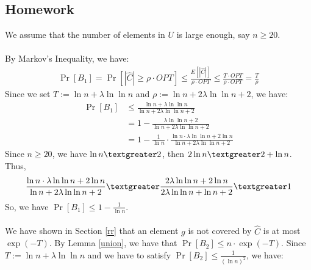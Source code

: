 \subsection{Homework}
We assume that the number of elements in $U$ is large enough, say $n \ge 20$.\\
\\
By Markov's Inequality, we have:
\begin{align}
  \nonumber \Pr[B_1]=\Pr[|\widehat{C}|\ge \rho \cdot OPT]\le \frac{E[|\widehat{C}|]}{\rho \cdot OPT}\le  \frac{T\cdot OPT}{\rho \cdot OPT} = \frac{T}{\rho}
\end{align}
Since we set $T := \ln n + \lambda \ln \ln n$ and $\rho:=\ln n+2\lambda \ln\ln n +2$, we have:
\begin{align}
  \nonumber \Pr[B_1] &\le \frac{\ln n + \lambda \ln \ln n}{\ln n+2\lambda \ln\ln n +2}\\
  \nonumber &=1-\frac{\lambda\ln\ln n+2}{\ln n + 2 \lambda \ln \ln n +2}\\
  \nonumber &=1-\frac{1}{\ln n}\cdot \frac{\ln n \cdot \lambda \ln \ln n +2\ln n}{\ln n + 2\lambda \ln\ln n +2 }
\end{align}
Since $n\ge 20$, we have $\ln n \textgreater 2$, then $2\ln n \textgreater 2+\ln n$.
Thus,
\begin{align}
  \nonumber \frac{\ln n \cdot \lambda \ln \ln n +2\ln n}{\ln n + 2\lambda \ln\ln n +2 }
  \textgreater \frac{2\lambda \ln \ln n +2\ln n}{2\lambda \ln\ln n+\ln n +2}
  \textgreater 1
\end{align}
So, we have $\Pr[B_1]\le 1-\frac{1}{\ln n}$.\\
\\
We have shown in Section \ref{rr} that an element $g$ is not covered by $\widehat{C}$ is at most $\exp({-T})$.
By Lemma \ref{union}, we have that $\Pr[B_2]\le n\cdot \exp({-T})$.
Since $T := \ln n + \lambda \ln \ln n$ and we have to satisfy  $\Pr[B_2]\le \frac{1}{(\ln n)^2}$, we have:
